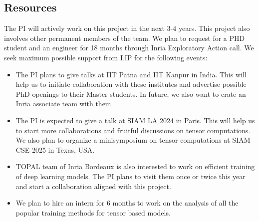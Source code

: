 \subsection*{Resources}

The PI will actively work on this project in the next 3-4 years. This project also involves other permanent members of the team. We plan to request for a PHD student and an engineer for 18 months through Inria Exploratory Action call. We seek maximum possible support from LIP for the following events:


\begin{itemize}
	\item The PI plans to give talks at IIT Patna and IIT Kanpur in India. This will help us to initiate collaboration with these institutes and advertise possible PhD openings to their Master students. In future, we also want to crate an Inria associate team with them.
	\item The PI is expected to give a talk at SIAM LA 2024 in Paris. This will help us to start more collaborations and fruitful discussions on tensor computations. We also plan to organize a minisymposium on tensor computations at SIAM CSE 2025 in Texas, USA.
	\item TOPAL team of Inria Bordeaux is also interested to work on efficient training of deep learning models. The PI plans to visit them once or twice this year and start a collaboration aligned with this project.
	\item We plan to hire an intern for $6$ months to work on the analysis of all the popular training methods for tensor based models.
\end{itemize} 


%




{\footnotesize }


